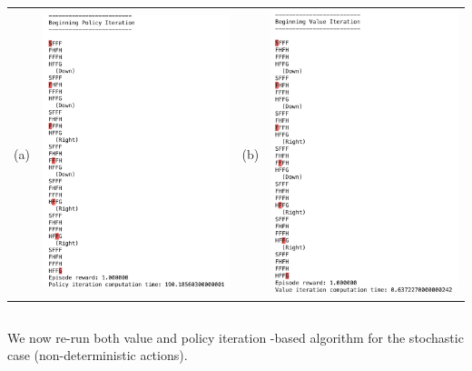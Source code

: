 \begin{center}
\begin{tabular}{lclc}
(a) & \includegraphics[width=7cm]{fig_pi_det.jpg} &
(b) & \includegraphics[width=7cm]{fig_vi_det.jpg} 
\end{tabular}
\label{fig_op_det}
\end{center}


\subsection{}
We now re-run both value and policy iteration -based algorithm for the stochastic case (non-deterministic actions).

